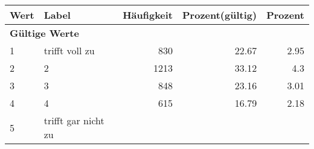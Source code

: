      \begin{longtable}{lXrrr}
     \toprule
     \textbf{Wert} & \textbf{Label} & \textbf{Häufigkeit} & \textbf{Prozent(gültig)} & \textbf{Prozent} \\
     \endhead
     \midrule
     \multicolumn{5}{l}{\textbf{Gültige Werte}}\\

     1 &
     \multicolumn{1}{X}{ trifft voll zu   } &


       \num{830} &
       \num[round-mode=places,round-precision=2]{22.67} &
         \num[round-mode=places,round-precision=2]{2.95} \\

     2 &
     \multicolumn{1}{X}{ 2   } &


       \num{1213} &
       \num[round-mode=places,round-precision=2]{33.12} &
         \num[round-mode=places,round-precision=2]{4.3} \\

     3 &
     \multicolumn{1}{X}{ 3   } &


       \num{848} &
       \num[round-mode=places,round-precision=2]{23.16} &
         \num[round-mode=places,round-precision=2]{3.01} \\

     4 &
     \multicolumn{1}{X}{ 4   } &


       \num{615} &
       \num[round-mode=places,round-precision=2]{16.79} &
         \num[round-mode=places,round-precision=2]{2.18} \\

     5 &
     \multicolumn{1}{X}{ trifft gar nicht zu   } &



\end{longtable}
